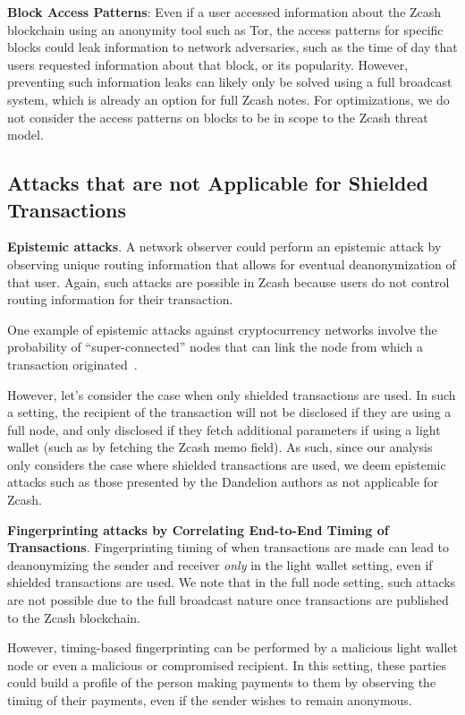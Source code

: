 \documentclass{article}
\begin{document}
\textbf{Block Access Patterns}: Even if a user accessed
information about the Zcash blockchain using an anonymity tool such as Tor, the
access patterns for specific blocks could leak information to network
adversaries, such as the time of day that users requested information about
that block, or its popularity. However, preventing such information leaks
can likely only be solved using a full broadcast system, which is already
an option for full Zcash notes. For optimizations, we do not consider the
access patterns on blocks to be in scope to the Zcash threat model.

\subsection{Attacks that are not Applicable for Shielded Transactions}

\textbf{Epistemic attacks}. A network observer could perform an epistemic
attack by observing unique routing information that allows for eventual
deanonymization of that user. Again, such attacks are possible in Zcash because
users do not control routing information for their transaction.

One example of epistemic attacks against cryptocurrency networks involve the
probability of ``super-connected'' nodes that can link the node from which a
transaction originated~\cite{dandelion, fanti2018dandelion}.

However, let's consider the case when only shielded transactions are used. In
such a setting, the recipient of the transaction will not be disclosed if they
are using a full node, and only disclosed if they fetch additional parameters
if using a light wallet (such as by fetching the Zcash memo field). As such,
since our analysis only considers the case where shielded transactions are
used, we deem epistemic attacks such as those presented by the Dandelion
authors as not applicable for Zcash.

\textbf{Fingerprinting attacks by Correlating End-to-End Timing of Transactions}.
Fingerprinting timing of when transactions are made
can lead to deanonymizing the sender and
receiver \emph{only} in the light wallet setting, even if shielded transactions
are used. We note that in the full node setting, such attacks are not possible
due to the full broadcast nature once transactions are published to the Zcash
blockchain.

However, timing-based fingerprinting can be performed by a
malicious light wallet node or even a malicious or compromised recipient. In
this setting, these parties could build a profile of the person making payments
to them by observing the timing of their payments, even if the sender wishes to remain
anonymous.
\end{document}
